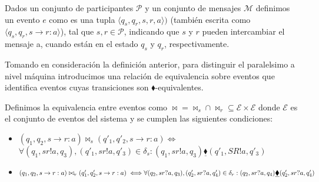 \begin{definition}[Eventos] Dados un conjunto de participantes $\mathcal{P}$ y un conjunto de mensajes $\mathcal{M}$ definimos un evento $e$ como es una tupla $\langle q_s, q_r, s, r, a \rangle)$ (también escrita como $\langle q_s, q_r, s \rightarrow r:a \rangle$), tal que $s,r \in \mathcal{P}$, indicando que $s$ y $r$ pueden intercambiar el mensaje a, cuando están en el estado $q_s$ y $q_r$, respectivamente.
\end{definition}

 Tomando en consideración la definición anterior, para distinguir el paralelsimo a nivel máquina introducimos una relación de equivalencia sobre eventos que identifica eventos cuyas transiciones son $\blacklozenge$-equivalentes.

\begin{definition} Definimos la equivalencia entre eventos como $\bowtie = \bowtie_s \cap \bowtie_r \subseteq \mathcal{E} \times \mathcal{E}$ donde $\mathcal{E}$ es el conjunto de eventos del sistema y se cumplen las siguientes condiciones:

\begin{itemize}
\item $(q_1, q_2, s \rightarrow r:a) \bowtie_s (q'_1, q'_2, s \rightarrow r:a) \iff$ \\ 
 $\forall (q_1, sr!a,q_3),(q'_1, sr!a,q'_3) \in \delta_s:(q_1, sr!a,q_3) \underline{\blacklozenge} (q'_1, SR!a,q'_3) $
\item $(q_1, q_2, s \rightarrow r:a) \bowtie_r (q'_1, q'_2, s \rightarrow r:a) \iff \\ 
\forall (q_2, sr?a,q_3),(q'_2, sr?a,q'_4) \in \delta_ r:(q_2, sr?a,q_4) \underline{\blacklozenge} (q'_2, sr?a,q'_4)$ \end{itemize}
\end{definition}
